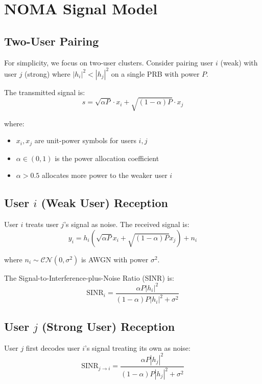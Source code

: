 \section{NOMA Signal Model}

\subsection{Two-User Pairing}

For simplicity, we focus on two-user clusters. Consider pairing user $i$ (weak) with user $j$ (strong) where $|h_i|^2 < |h_j|^2$ on a single PRB with power $P$.

The transmitted signal is:
\begin{equation}
s = \sqrt{\alpha P} \cdot x_i + \sqrt{(1-\alpha) P} \cdot x_j
\end{equation}

where:
\begin{itemize}
    \item $x_i, x_j$ are unit-power symbols for users $i, j$
    \item $\alpha \in (0, 1)$ is the power allocation coefficient
    \item $\alpha > 0.5$ allocates more power to the weaker user $i$
\end{itemize}

\subsection{User $i$ (Weak User) Reception}

User $i$ treats user $j$'s signal as noise. The received signal is:
\begin{equation}
y_i = h_i \left( \sqrt{\alpha P} x_i + \sqrt{(1-\alpha) P} x_j \right) + n_i
\end{equation}

where $n_i \sim \mathcal{CN}(0, \sigma^2)$ is AWGN with power $\sigma^2$.

The Signal-to-Interference-plus-Noise Ratio (SINR) is:
\begin{equation}
\text{SINR}_i = \frac{\alpha P |h_i|^2}{(1-\alpha) P |h_i|^2 + \sigma^2}
\label{eq:sinr_weak}
\end{equation}

\subsection{User $j$ (Strong User) Reception}

User $j$ first decodes user $i$'s signal treating its own as noise:
\begin{equation}
\text{SINR}_{j \to i} = \frac{\alpha P |h_j|^2}{(1-\alpha) P |h_j|^2 + \sigma^2}
\label{eq:sinr_sic}
\end{equation}

